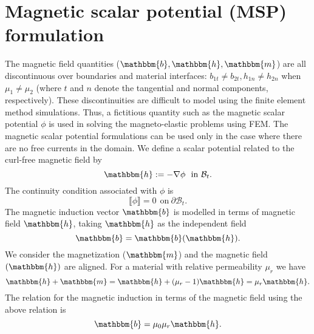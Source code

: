 \section{Magnetic scalar potential (MSP) formulation}
The magnetic field quantities ($\mathbbm{b}, \mathbbm{h}, \mathbbm{m}$) are all discontinuous over boundaries and material interfaces: $b_{1t} \neq b_{2t}, h_{1n} \neq h_{2n}$ when $\mu_1 \neq \mu_2$ (where $t$ and $n$ denote the tangential and normal components, respectively). These discontinuities are difficult to model using the finite element method simulations. Thus, a fictitious quantity such as the magnetic scalar potential $\phi$ is used in solving the magneto-elastic problems using FEM. The magnetic scalar potential formulations can be used only in the case where there are no free currents in the domain. We define a scalar potential related to the curl-free magnetic field by \cite{pelteret2016}
\begin{equation}
\mathbbm{h} := -\nabla \phi \ \ \text{in} \ \mathcal{B}_t. 
\label{eq:1.5}
\end{equation}
The continuity condition associated with $\phi$ is 
\begin{equation}
\llbracket \phi \rrbracket = 0 \ \ \text{on} \ \partial\mathcal{B}_t.
\end{equation}
The magnetic induction vector $\mathbbm{b}$ is modelled in terms of magnetic field $\mathbbm{h}$, taking $\mathbbm{h}$ as the independent field
\begin{equation}
\mathbbm{b} = \mathbbm{b}(\mathbbm{h}).
\end{equation}
We consider the magnetization ($\mathbbm{m}$) and the magnetic field $(\mathbbm{h})$ are aligned. For a material with relative permeability $\mu_r$ we have
\begin{equation}
\mathbbm{h} + \mathbbm{m} = \mathbbm{h} + (\mu_r - 1)\mathbbm{h} = \mu_r \mathbbm{h}.
\end{equation}
The relation for the magnetic induction in terms of the magnetic field using the above relation is
\begin{equation}
\mathbbm{b} = \mu_0 \mu_r \mathbbm{h}.
\label{eq:1.7}
\end{equation}


